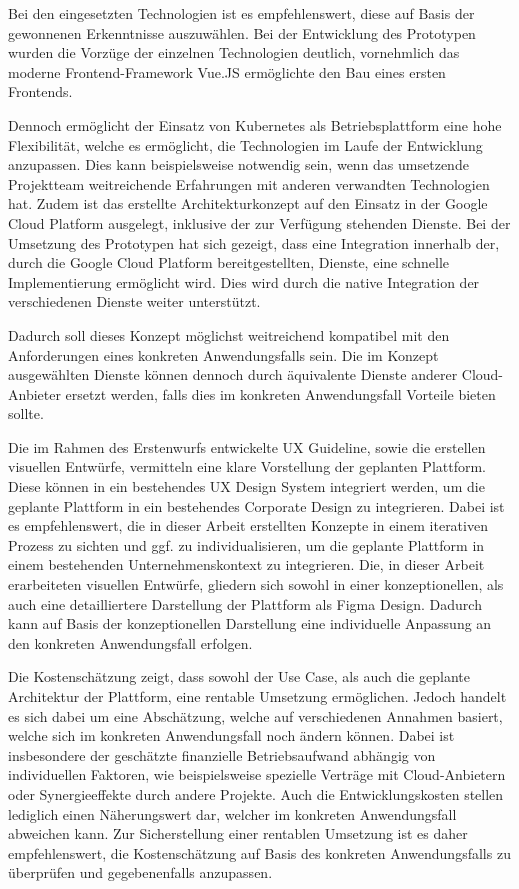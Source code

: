 Bei den eingesetzten Technologien ist es empfehlenswert, diese auf Basis der gewonnenen Erkenntnisse auszuwählen.
Bei der Entwicklung des Prototypen wurden die Vorzüge der einzelnen Technologien deutlich, vornehmlich das moderne Frontend-Framework Vue.JS ermöglichte den Bau eines ersten Frontends.

Dennoch ermöglicht der Einsatz von Kubernetes als Betriebsplattform eine hohe Flexibilität, welche es ermöglicht, die Technologien im Laufe der Entwicklung anzupassen.
Dies kann beispielsweise notwendig sein, wenn das umsetzende Projektteam weitreichende Erfahrungen mit anderen verwandten Technologien hat.
Zudem ist das erstellte Architekturkonzept auf den Einsatz in der Google Cloud Platform ausgelegt, inklusive der zur Verfügung stehenden Dienste.
Bei der Umsetzung des Prototypen hat sich gezeigt, dass eine Integration innerhalb der, durch die Google Cloud Platform bereitgestellten, Dienste, eine schnelle Implementierung ermöglicht wird.
Dies wird durch die native Integration der verschiedenen Dienste weiter unterstützt.

Dadurch soll dieses Konzept möglichst weitreichend kompatibel mit den Anforderungen eines konkreten Anwendungsfalls sein.
Die im Konzept ausgewählten Dienste können dennoch durch äquivalente Dienste anderer Cloud-Anbieter ersetzt werden, falls dies im konkreten Anwendungsfall Vorteile bieten sollte.

Die im Rahmen des Erstenwurfs entwickelte UX Guideline, sowie die erstellen visuellen Entwürfe, vermitteln eine klare Vorstellung der geplanten Plattform.
Diese können in ein bestehendes UX Design System integriert werden, um die geplante Plattform in ein bestehendes Corporate Design zu integrieren.
Dabei ist es empfehlenswert, die in dieser Arbeit erstellten Konzepte in einem iterativen Prozess zu sichten und ggf. zu individualisieren, um die geplante Plattform in einem bestehenden Unternehmenskontext zu integrieren.
Die, in dieser Arbeit erarbeiteten visuellen Entwürfe, gliedern sich sowohl in einer konzeptionellen, als auch eine detailliertere Darstellung der Plattform als Figma Design.
Dadurch kann auf Basis der konzeptionellen Darstellung eine individuelle Anpassung an den konkreten Anwendungsfall erfolgen.

Die Kostenschätzung zeigt, dass sowohl der Use Case, als auch die geplante Architektur der Plattform, eine rentable Umsetzung ermöglichen.
Jedoch handelt es sich dabei um eine Abschätzung, welche auf verschiedenen Annahmen basiert, welche sich im konkreten Anwendungsfall noch ändern können.
Dabei ist insbesondere der geschätzte finanzielle Betriebsaufwand abhängig von individuellen Faktoren, wie beispielsweise spezielle Verträge mit Cloud-Anbietern oder Synergieeffekte durch andere Projekte.
Auch die Entwicklungskosten stellen lediglich einen Näherungswert dar, welcher im konkreten Anwendungsfall abweichen kann.
Zur Sicherstellung einer rentablen Umsetzung ist es daher empfehlenswert, die Kostenschätzung auf Basis des konkreten Anwendungsfalls zu überprüfen und gegebenenfalls anzupassen.

